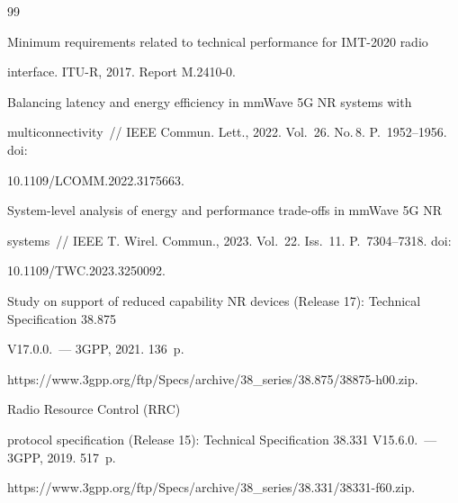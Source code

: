 {\small\frenchspacing


{%




\begin{thebibliography}{99}




Minimum requirements related to technical performance for IMT-2020 radio  


interface. ITU-R, 2017. Report  M.2410-0. 




 Balancing latency and energy efficiency in mmWave 5G NR systems with 


multiconnectivity~/\!\!/  IEEE Commun. Lett., 2022. Vol.~26. No.\,8. P.~1952--1956. doi: 


10.1109\!/\!LCOMM.2022.3175663. 




 System-level analysis of energy and performance trade-offs in mmWave 5G NR 


systems~/\!\!/  IEEE T. Wirel. Commun., 2023. Vol.~22. Iss.~11. P.~7304--7318. doi: 


10.1109\!/\!TWC.2023.3250092.




Study on support of reduced capability NR devices (Release 17): Technical Specification 38.875 


V17.0.0.~--- 3GPP, 2021. 136~p. 


{\sf https://\linebreak www.3gpp.org/ftp/Specs/archive/38\_series/38.875/38875-h00.zip}.




Radio Resource Control (RRC) 


protocol specification (Release 15): Technical Specification 38.331 V15.6.0.~--- 3GPP, 2019. 517~p.


{\sf https://www.3gpp.org/ftp/Specs/\linebreak archive/38\_series/38.331/38331-f60.zip}.







\end{thebibliography}}}
